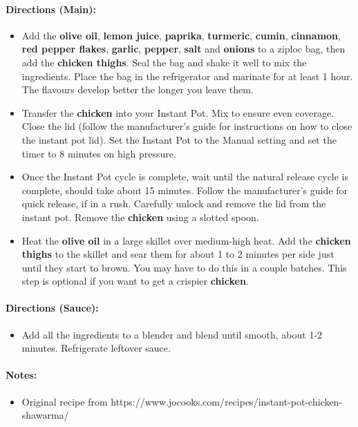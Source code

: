 \documentclass{article}
\begin{document}
\paragraph{Directions (Main):}
\begin{itemize}
    \item Add the \textbf{olive oil}, \textbf{lemon juice}, \textbf{paprika}, \textbf{turmeric}, \textbf{cumin}, \textbf{cinnamon}, \textbf{red pepper flakes}, \textbf{garlic}, \textbf{pepper}, \textbf{salt} and \textbf{onions} to a ziploc bag, then add the \textbf{chicken thighs}. Seal the bag and shake it well to mix the ingredients. Place the bag in the refrigerator and marinate for at least 1 hour. The flavours develop better the longer you leave them.
    \item Transfer the \textbf{chicken} into your Instant Pot. Mix to ensure even coverage. Close the lid (follow the manufacturer’s guide for instructions on how to close the instant pot lid). Set the Instant Pot to the Manual setting and set the timer to 8 minutes on high pressure.
    \item Once the Instant Pot cycle is complete, wait until the natural release cycle is complete, should take about 15 minutes. Follow the manufacturer’s guide for quick release, if in a rush. Carefully unlock and remove the lid from the instant pot. Remove the \textbf{chicken} using a slotted spoon.
    \item Heat the \textbf{olive oil} in a large skillet over medium-high heat. Add the \textbf{chicken thighs} to the skillet and sear them for about 1 to 2 minutes per side just until they start to brown. You may have to do this in a couple batches. This step is optional if you want to get a crispier \textbf{chicken}.
\end{itemize}  

\paragraph{Directions (Sauce):}
\begin{itemize}
    \item Add all the ingredients to a blender and blend until smooth, about 1-2 minutes. Refrigerate leftover sauce.
\end{itemize} 

\paragraph{Notes:}
\begin{itemize}
    \item Original recipe from https://www.jocooks.com/recipes/instant-pot-chicken-shawarma/
\end{itemize}
\end{document}
